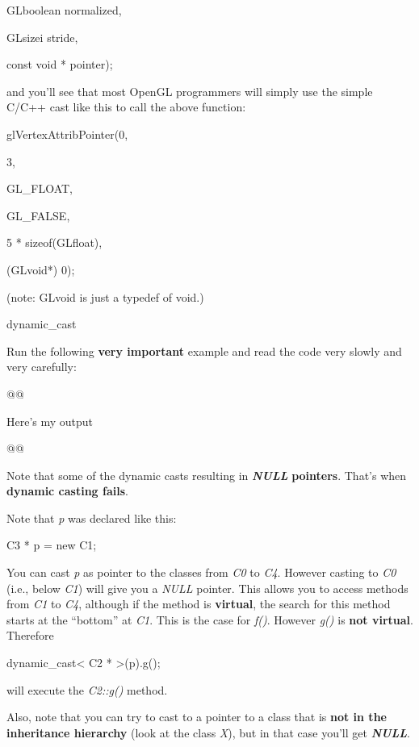 \documentclass[
]{article}
\begin{document}
GLboolean normalized,

GLsizei stride,

const void * pointer);

and you'll see that most OpenGL programmers will simply use the simple
C/C++ cast like this to call the above function:

glVertexAttribPointer(0,

3,

GL\_FLOAT,

GL\_FALSE,

5 * sizeof(GLfloat),

(GLvoid*) 0);

(note: GLvoid is just a typedef of void.)

dynamic\_cast

Run the following \textbf{very important} example and read the code very
slowly and very carefully:

\begin{longtable}[]{@{}@{}}
\toprule\noalign{}
\endhead
\bottomrule\noalign{}
\endlastfoot
\end{longtable}

Here's my output

\begin{longtable}[]{@{}@{}}
\toprule\noalign{}
\endhead
\bottomrule\noalign{}
\endlastfoot
\end{longtable}

Note that some of the dynamic casts resulting in
\emph{\textbf{NULL}}\textbf{ pointers}. That's when \textbf{dynamic
casting fails}.

Note that \emph{p} was declared like this:

C3 * p = new C1;

You can cast \emph{p} as pointer to the classes from \emph{C0 }to
\emph{C4}. However casting to \emph{C0 }(i.e., below \emph{C1}) will
give you a \emph{NULL} pointer. This allows you to access methods from
\emph{C1} to \emph{C4}, although if the method is \textbf{virtual}, the
search for this method starts at the ``bottom'' at \emph{C1}. This is
the case for \emph{f()}. However \emph{g()} is \textbf{not virtual}.
Therefore

dynamic\_cast\textless{} C2 * \textgreater(p).g();

will execute the \emph{C2::g()} method.

Also, note that you can try to cast to a pointer to a class that is
\textbf{not in the inheritance hierarchy} (look at the class \emph{X}),
but in that case you'll get \emph{\textbf{NULL}}.
\end{document}
